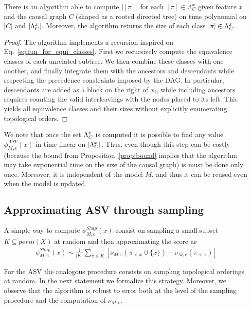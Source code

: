 \begin{proposition}
	There is an algorithm able to compute $|[\pi]|$ for each $[\pi] \in \Lambda^x_C$ given feature $x$ and the causal graph $C$ (shaped as a rooted directed tree) on time polynomial on $|C|$ and $|\Lambda_C^x|$. Moreover, the algorithm returns the size of each class $[\pi] \in \Lambda_C^x$.
\end{proposition}

\begin{proof}
	The algorithm implements a recursion inspired on Eq.~\eqref{eq:fun_for_equi_classes}. First we recursively compute the equivalence classes of each unrelated subtree. We then combine these classes with one another, and finally integrate them with the ancestors and descendants while respecting the precedence constraints imposed by the DAG. In particular, descendants are added as a block on the right of $x_i$, while including ancestors requires counting the valid interleavings with the nodes placed to its left. This yields all equivalence classes and their sizes without explicitly enumerating topological orders.
\end{proof}

We note that once the set $\Lambda_C^x$ is computed it is possible to find any value $\phi_{M,e}^{ASV}(x)$ in time linear on $|\Lambda_C^x|$. Thus, even though this step can be costly
(because the bound from Proposition~\ref{prop:bound} implies that the algorithm may take exponential time on the size of the causal graph) is must be done only once. Moreover, it is independent of the model $M$, and thus it can be reused even
when the model is updated.

\subsection{Approximating ASV through sampling}

\newcommand{\subsetPerm}{K}

A simple way to compute $\phi_{M,e}^{Shap}(x)$ consist on sampling a small subset $\subsetPerm \subseteq perm(X)$ at random and then approximating the score as
%
\begin{align*}
	\phi^{Shap}_{M,e}(x) \sim \frac{1}{|\subsetPerm|} \sum_{\pi \in \subsetPerm} \left[ \nu_{M,e}(\pi_{<x} \cup \{x\}) - \nu_{M,e}(\pi_{<x}) \right]
\end{align*}

For the ASV the analogous procedure consists on sampling topological orderings at random. In the next statement we formalize this strategy. Moreover, we observe that the algorithm is robust to error both at the level of the sampling procedure and the computation of $\nu_{M,e}$.

